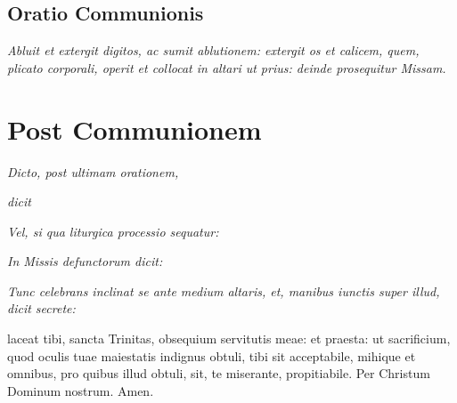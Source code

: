 \subsection{Oratio Communionis}

\textit{%
    Abluit et extergit digitos, ac sumit ablutionem: extergit os et calicem,
    quem, plicato corporali, operit et collocat in altari ut prius: deinde
    prosequitur Missam.
}



\section{Post Communionem}



\textit{Dicto, post ultimam orationem,}


\textit{dicit}


\divisio

\textit{Vel, si qua liturgica processio sequatur:}


\divisio


\divisio

\textit{In Missis defunctorum dicit:}


\divisio

\textit{%
    Tunc celebrans inclinat se ante medium altaris, et, manibus iunctis super
    illud, dicit secrete:
}

laceat tibi, sancta Trinitas, obsequium servitutis meae: et
praesta: ut sacrificium, quod oculis tuae maiestatis indignus obtuli, tibi sit
acceptabile, mihique et omnibus, pro quibus illud obtuli, sit, te miserante,
propitiabile.  Per Christum Dominum nostrum.  Amen.

